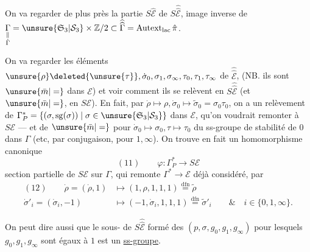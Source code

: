 On va regarder de plus près la partie $S\hat{\mathcal E}$ de $S\widehat{\widehat{\mathcal E}}$, image inverse de
$\underset{\substack{\Vert\\\hat\Gamma}}{\Gamma}=\unsure{\mathfrak S_3|\mathcal S_3}\times\mathbb Z/2\subset\widehat{\widehat\Gamma}=\operatorname{Autext}_{\mathrm{lac}}\hat\pi$.

On va regarder les éléments $\unsure{\rho}\deleted{\unsure{\tau}},\dot\sigma_0,\sigma_1,\sigma_\infty,\tau_0,\tau_1,\tau_\infty$ de $\widehat{\widehat{\mathcal E}}$,  (NB. ils sont $\unsure{\bar m|=}$ dans $\mathcal E$) et voir comment ils se relèvent en $S\widehat{\widehat{\mathcal E}}$ (et $\unsure{\bar m|=}$, en $S\mathcal E$). En fait, par $\dot\rho\mapsto\rho,\dot\sigma_0\mapsto\tilde\sigma_0=\sigma_0\tau_0$, on a un relèvement  de $\Gamma_P^*=\{(\sigma,\operatorname{sg}(\sigma))\mid\sigma\in\unsure{\mathfrak S_3|\mathcal S_3}\}$ dans $\mathcal E$, qu'on voudrait remonter à $S\mathcal E$ --- et de $\unsure{\bar m|=}$ pour $\dot\sigma_0\mapsto\sigma_0,\tau\mapsto\tau_0$ du ss-groupe de stabilité de $0$ dans $\Gamma$ (etc, par conjugaison,  pour $1,\infty$). On trouve en fait un homomorphisme canonique
\[
(11)\qquad\varphi:\Gamma_P^*\longrightarrow S\mathcal E
\]
 section partielle de $S\mathcal E$ sur $\Gamma$, qui remonte $\Gamma^*\to\mathcal E$ déjà considéré, par
\[
\begin{aligned}
(12)\qquad \dot\rho=(\dot\rho,1)&\longmapsto(1,\rho,1,1,1)\overset{\mathrm{dfn}}{=}\tilde\rho\\
\dot\sigma'_i=(\dot\sigma_i,-1)&\longmapsto(-1,\dot\sigma_i,1,1,1)\overset{\mathrm{dfn}}{=}\tilde\sigma'_i\qquad\&\quad i\in\{0,1,\infty\}.
\end{aligned}
\]

On peut dire aussi que le sous- de $S\widehat{\widehat{\mathcal E}}$ formé des $(p,\sigma,g_0,g_1,g_\infty)$ pour lesquels $g_0,g_1,g_\infty$ sont égaux à $1$ est un \uline{ss-groupe}.
